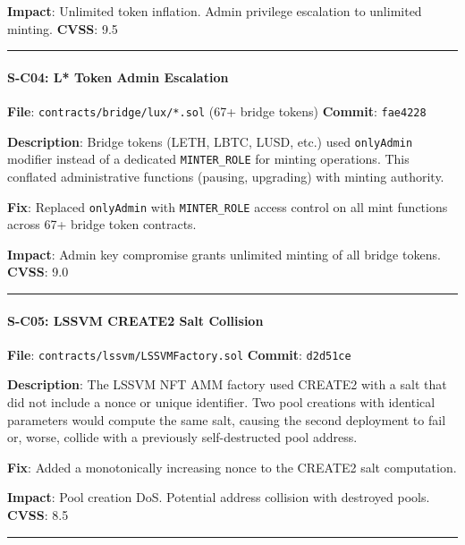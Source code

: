 \documentclass[
]{article}
\begin{document}
\textbf{Impact}: Unlimited token inflation. Admin privilege escalation
to unlimited minting. \textbf{CVSS}: 9.5

\begin{center}\rule{0.5\linewidth}{0.5pt}\end{center}

\paragraph{S-C04: L* Token Admin
Escalation}\label{s-c04-l-token-admin-escalation}

\textbf{File}: \texttt{contracts/bridge/lux/*.sol} (67+ bridge tokens)
\textbf{Commit}: \texttt{fae4228}

\textbf{Description}: Bridge tokens (LETH, LBTC, LUSD, etc.) used
\texttt{onlyAdmin} modifier instead of a dedicated \texttt{MINTER\_ROLE}
for minting operations. This conflated administrative functions
(pausing, upgrading) with minting authority.

\textbf{Fix}: Replaced \texttt{onlyAdmin} with \texttt{MINTER\_ROLE}
access control on all mint functions across 67+ bridge token contracts.

\textbf{Impact}: Admin key compromise grants unlimited minting of all
bridge tokens. \textbf{CVSS}: 9.0

\begin{center}\rule{0.5\linewidth}{0.5pt}\end{center}

\paragraph{S-C05: LSSVM CREATE2 Salt
Collision}\label{s-c05-lssvm-create2-salt-collision}

\textbf{File}: \texttt{contracts/lssvm/LSSVMFactory.sol}
\textbf{Commit}: \texttt{d2d51ce}

\textbf{Description}: The LSSVM NFT AMM factory used CREATE2 with a salt
that did not include a nonce or unique identifier. Two pool creations
with identical parameters would compute the same salt, causing the
second deployment to fail or, worse, collide with a previously
self-destructed pool address.

\textbf{Fix}: Added a monotonically increasing nonce to the CREATE2 salt
computation.

\textbf{Impact}: Pool creation DoS. Potential address collision with
destroyed pools. \textbf{CVSS}: 8.5

\begin{center}\rule{0.5\linewidth}{0.5pt}\end{center}
\end{document}
